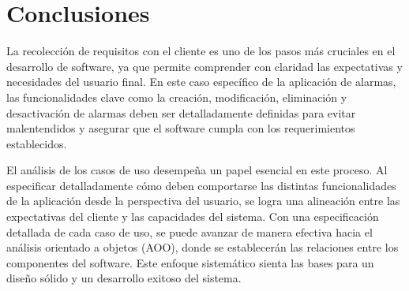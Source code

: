 \section{Conclusiones}
La recolección de requisitos con el cliente es uno de los pasos más cruciales en el desarrollo de software, ya que permite comprender con claridad las expectativas y necesidades del usuario final. En este caso específico de la aplicación de alarmas, las funcionalidades clave como la creación, modificación, eliminación y desactivación de alarmas deben ser detalladamente definidas para evitar malentendidos y asegurar que el software cumpla con los requerimientos establecidos.

El análisis de los casos de uso desempeña un papel esencial en este proceso. Al especificar detalladamente cómo deben comportarse las distintas funcionalidades de la aplicación desde la perspectiva del usuario, se logra una alineación entre las expectativas del cliente y las capacidades del sistema. Con una especificación detallada de cada caso de uso, se puede avanzar de manera efectiva hacia el análisis orientado a objetos (AOO), donde se establecerán las relaciones entre los componentes del software. Este enfoque sistemático sienta las bases para un diseño sólido y un desarrollo exitoso del sistema.